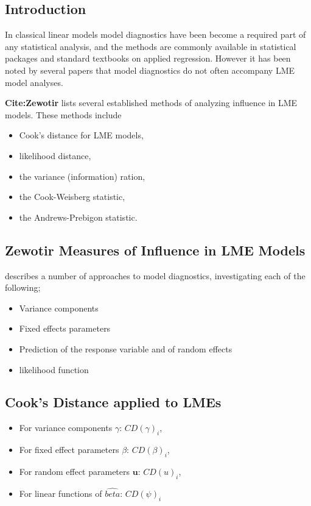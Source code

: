 \documentclass[12pt, a4paper]{article}
\theoremstyle{plain}
\theoremstyle{definition}
\theoremstyle{remark}
\begin{document}
\subsection{Introduction}%
In classical linear models model diagnostics have been become a required part of any statistical analysis, and the methods are commonly available in statistical packages and standard textbooks on applied regression. However it has been noted by several papers that model diagnostics do not often accompany LME model analyses.

\textbf{Cite:Zewotir} lists several established methods of analyzing influence in LME models. These methods include \begin{itemize}
\item Cook's distance for LME models,
\item {} likelihood distance,
\item the variance (information) ration,
\item the  Cook-Weisberg statistic,
\item the  Andrews-Prebigon statistic.
\end{itemize}

\subsection{Zewotir Measures of Influence in LME Models}%
\citet{Zewotir} describes a number of approaches to model diagnostics, investigating each of the following;
\begin{itemize}
\item Variance components
\item Fixed effects parameters
\item Prediction of the response variable and of random effects
\item likelihood function
\end{itemize}

\subsection{Cook's Distance applied to LMEs}
\begin{itemize}
\item For variance components $\gamma$: $CD(\gamma)_i$,
\item For fixed effect parameters $\beta$: $CD(\beta)_i$,
\item For random effect parameters $\boldsymbol{u}$: $CD(u)_i$,
\item For linear functions of $\hat{beta}$: $CD(\psi)_i$
\end{itemize}
\end{document}
